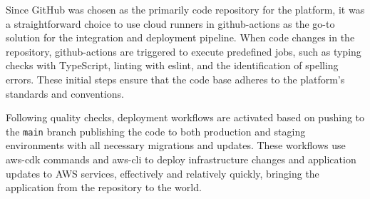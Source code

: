 Since GitHub was chosen as the primarily code repository for the platform, it was a straightforward choice to use cloud runners in \gls{github-actions} as the go-to solution for the integration and deployment pipeline.
When code changes in the repository, \gls{github-actions} are triggered to execute predefined jobs, such as typing checks with TypeScript, linting with \gls{eslint}, and the identification of spelling errors.
These initial steps ensure that the code base adheres to the platform's standards and conventions.

Following quality checks, deployment workflows are activated based on pushing to the \texttt{main} branch publishing the code to both production and staging environments with all necessary migrations and updates.
These workflows use \gls{aws-cdk} commands and \gls{aws-cli} to deploy infrastructure changes and application updates to \ac{AWS} services, effectively and relatively quickly, bringing the application from the repository to the world.



